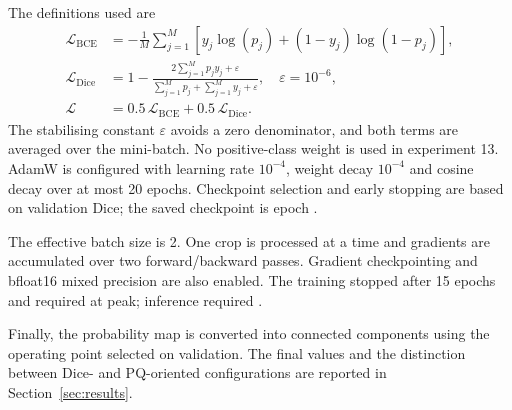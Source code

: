 The definitions used are
\begin{equation}
\begin{aligned}
\mathcal{L}_{\mathrm{BCE}}
  &= -\frac{1}{M}\sum_{j=1}^{M}\left[y_j\log(p_j)+(1-y_j)\log(1-p_j)\right],\\
\mathcal{L}_{\mathrm{Dice}}
  &= 1-\frac{2\sum_{j=1}^{M}p_jy_j+\varepsilon}
  {\sum_{j=1}^{M}p_j+\sum_{j=1}^{M}y_j+\varepsilon},\quad \varepsilon=10^{-6},\\
\mathcal{L} &= 0.5\,\mathcal{L}_{\mathrm{BCE}}+0.5\,\mathcal{L}_{\mathrm{Dice}}.
\end{aligned}
\end{equation}
The stabilising constant $\varepsilon$ avoids a zero denominator, and both terms are
averaged over the mini-batch.
No positive-class weight is used in experiment 13. AdamW is configured with learning
rate $10^{-4}$, weight decay $10^{-4}$ and cosine decay over at most 20 epochs.
Checkpoint selection and early stopping are based on validation Dice; the saved
checkpoint is epoch \finalepoch.

The effective batch size is 2. One crop is processed at a time and gradients are
accumulated over two forward/backward passes. Gradient checkpointing and bfloat16 mixed
precision are also enabled. The training stopped after 15 epochs and required
\finaltrainmemory{} at peak; inference required \finaltestmemory{}.

Finally, the probability map is converted into connected components using the operating
point selected on validation. The final values and the distinction between Dice- and
PQ-oriented configurations are reported in Section~\ref{sec:results}.
